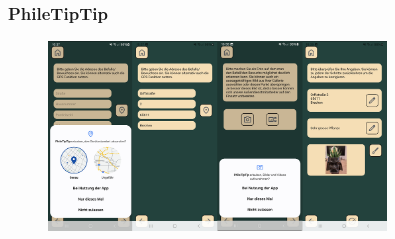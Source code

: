 \begin{frame}
\frametitle{PhileTipTip}

\begin{figure}
  \includegraphics[width=0.8\textwidth]{figures/userworkflow.jpg}
  \label{fig:workflow}
\end{figure}

\end{frame}




